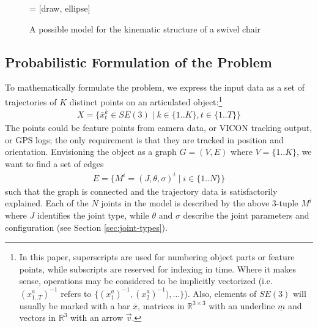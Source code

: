 \documentclass[letterpaper, 10 pt, conference]{ieeeconf}  %
\begin{document}
        \begin{figure}[ht]
          \centering
           = [draw, ellipse]
          \caption{A possible model for the kinematic structure of a swivel chair}
          \label{fig:Sswivel}
        \end{figure}

\subsection{Probabilistic Formulation of the Problem}
To mathematically formulate the problem, we express the input data as a set of trajectories of $K$ distinct points on an articulated object:\footnote{In this paper, superscripts are used for numbering object parts or feature points, while subscripts are reserved for indexing in time. Where it makes sense, operations may be considered to be implicitly vectorized (i.e. $(x_{1..T}^a)^{-1}$ refers to $\{(x_1^a)^{-1}, (x_2^a)^{-1}), \dots\}$). Also, elements of $SE(3)$ will usually be marked with a bar $\bar{x}$, matrices in $\mathbb{R}^{3 \times 3}$ with an underline $\underline{m}$ and vectors in $\mathbb{R}^3$ with an arrow $\vec{v}$.}
\begin{align}
  X = \{ \bar{x}_t^k \in SE(3) \mid k \in \{1..K\}, t \in \{1..T\} \}
\end{align}
The points could be feature points from camera data, or VICON tracking output, or GPS logs; the only requirement is that they are tracked in position and orientation. Envisioning the object as a graph $G = (V,E)$ where $V = \{1..K\}$, we want to find a set of edges
\begin{align}
  E = \{M^i = (J,\theta,\sigma)^i \mid i \in \{1..N\}\} \label{eqn:m-tuple}
\end{align}
such that the graph is connected and the trajectory data is satisfactorily explained. Each of the $N$ joints in the model is described by the above 3-tuple $M^i$ where $J$ identifies the joint type, while $\theta$ and $\sigma$ describe the joint parameters and configuration (see Section \ref{sec:joint-types}).
\end{document}
